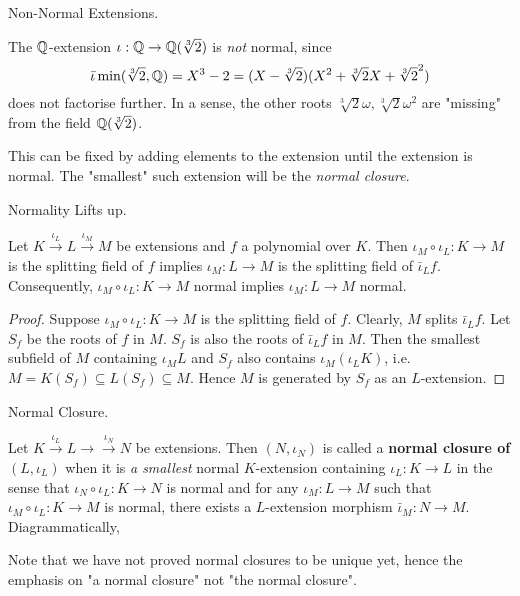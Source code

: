 \documentclass[../book.tex]{subfiles}
\begin{document}
\begin{eg} Non-Normal Extensions. 
    
    The $\mathbb{Q}$-extension $\iota : \mathbb{Q} \to \mathbb{Q}(\sqrt[3]{2})$ is \emph{not} normal, 
    since \[
        \bar\iota\min(\sqrt[3]{2},\mathbb{Q}) = X^3 - 2 
        = (X - \sqrt[3]{2})(X^2 + \sqrt[3]{2}X + \sqrt[3]{2}^2)
    \]
    does not factorise further. 
    In a sense, the other roots $\sqrt[3]{2}\omega, \sqrt[3]{2}\omega^2$ 
    are "missing" from the field $\mathbb{Q}(\sqrt[3]{2})$. 
    
    This can be fixed by adding elements to the extension until 
    the extension is normal.
    The "smallest" such extension will be the \emph{normal closure}.
\end{eg}
\begin{lem} Normality Lifts up. 

    Let $K \overset{\iota_L}{\to} L \overset{\iota_M}{\to} M$ be extensions
    and $f$ a polynomial over $K$. 
    Then $\iota_M\circ\iota_L : K \to M$ is the splitting field of $f$
    implies $\iota_M : L \to M$ is the splitting field of $\bar\iota_L f$. 
    Consequently, $\iota_M\circ\iota_L : K \to M$ normal 
    implies $\iota_M : L \to M$ normal. 
    
\end{lem}
\begin{proof}
    Suppose $\iota_M\circ\iota_L : K \to M$ is the splitting field of $f$. 
    Clearly, $M$ splits $\bar\iota_L f$. 
    Let $S_f$ be the roots of $f$ in $M$. 
    $S_f$ is also the roots of $\bar\iota_L f$ in $M$. 
    Then the smallest subfield of $M$ containing $\iota_M L$ and $S_f$ 
    also contains $\iota_M(\iota_L K)$, 
    i.e. $M = K(S_f) \subseteq L(S_f) \subseteq M$.
    Hence $M$ is generated by $S_f$ as an $L$-extension. 
\end{proof}
\begin{dfn} Normal Closure. 
    
    Let $K \overset{\iota_L}{\to} L \to \overset{\iota_N}{\to} N$ be extensions. 
    Then $(N,\iota_N)$ is called 
    a \textbf{normal closure of $(L,\iota_L)$} when
    it is \emph{a smallest} normal $K$-extension containing $\iota_L : K \to L$
    in the sense that $\iota_N\circ\iota_L : K \to N$ is normal and 
    for any $\iota_M : L \to M$ such that $\iota_M\circ\iota_L : K \to M$ is normal,
    there exists a $L$-extension morphism $\bar\iota_M : N \to M$.
    Diagrammatically, 
    \begin{figure} [H]
        \centering
    \end{figure}
    
    Note that we have not proved normal closures to be unique yet,
    hence the emphasis on "a normal closure" not "the normal closure". 
\end{dfn}
\end{document}

